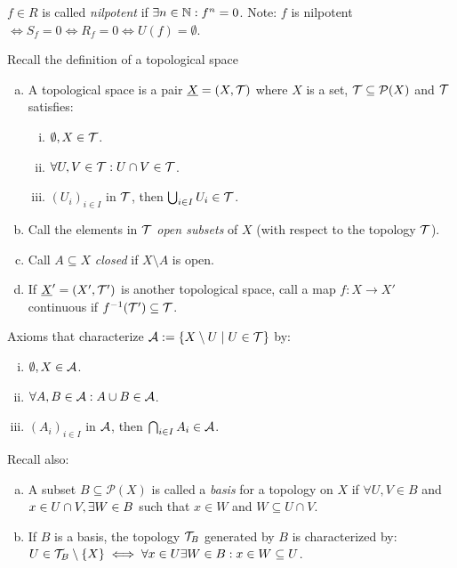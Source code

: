 \documentclass[a4paper]{report}
\begin{document}
\begin{defi} $f \in R$ is called \emph{nilpotent} if $\exists n\in \mathbb{N} : f^{n} = 0$. Note: $f$ is nilpotent $\iff S_{f} = 0 \iff R_{f} = 0 \iff U(f) = \emptyset$.
\end{defi}
\begin{rem*}Recall the definition of a topological space
  \begin{enumerate}[(a)]
    \item A topological space is a pair $\underline X = (X, \mathcal{T})$ where $X$ is a set, $\mathcal{T} \subseteq \mathcal P(X)$ and $\mathcal{T}$ satisfies:
          \begin{enumerate}[(i)]
            \item $\emptyset, X \in \mathcal{T}$.
            \item $\forall U, V \in \mathcal{T}: U \cap V \in \mathcal{T}$.
                  \item $(U_{i})_{i \in I}$ in $\mathcal{T}$, then $\bigcup_{i \in I}U_{i} \in \mathcal{T}$.
          \end{enumerate}
    \item Call the elements in $\mathcal{T}$ \emph{open subsets} of $X$ (with respect to the topology $\mathcal{T}$).
    \item Call $A \subseteq X$ \emph{closed} if $X \setminus A$ is open.
          \item If $\underline X' = (X', \mathcal{T}')$ is another topological space, call a map $f: X \to X'$ continuous if $f^{-1}(\mathcal{T}') \subseteq \mathcal{T}$.
  \end{enumerate}
  Axioms that characterize $\mathcal{A}:= \{X \setminus U \mid U \in \mathcal{T}\}$ by:
  \begin{enumerate}[(i)]
    \item $\emptyset , X \in \mathcal{A}$.
    \item $\forall A, B \in \mathcal{A}: A \cup B \in \mathcal{A}$.
          \item $(A_{i})_{i \in I}$ in $\mathcal{A}$, then $\bigcap_{i \in I}A_{i} \in \mathcal{A}$.
  \end{enumerate}
\end{rem*}
\begin{defi}
  Recall also:
  \begin{enumerate}[(a)]
    \item A subset $B \subseteq \mathcal P(X)$ is called a \emph{basis} for a topology on $X$ if $\forall U, V \in B$ and $x \in U \cap V, \exists W \in B$ such that $x \in W$ and $W \subseteq U \cap V$.
          \item If $B$ is a basis, the topology $\mathcal{T}_{B}$ generated by $B$ is characterized by: $U \in \mathcal{T}_{B} \setminus \{X\} \iff \forall x \in U \exists W \in B: x \in W \subseteq U$.
  \end{enumerate}
\end{defi}
\end{document}
